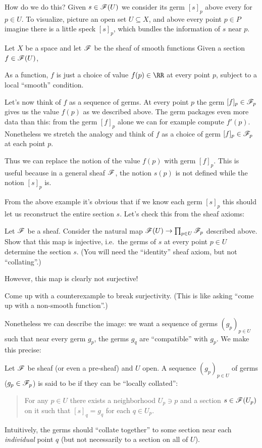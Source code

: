 \documentclass[11pt]{scrreprt}
\begin{document}
How do we do this?
Given $s \in \mathscr F(U)$ we consider its germ $[s]_p$ above every for $p \in U$.
To visualize, picture an open set $U \subseteq X$,
and above every point $p \in P$ imagine there is a little speck $[s]_p$,
which bundles the information of $s$ near $p$.
\begin{example}
	Let $X$ be a space and let $\mathscr F$ be the sheaf of smooth functions 
	Given a section $f \in \mathscr F(U)$,
	\begin{itemize}
		\ii As a function, $f$ is just a choice of value $f(p) \in \RR$ at
		every point $p$, subject to a local ``smooth'' condition.

		\ii Let's now think of $f$ as a sequence of germs.
		At every point $p$ the germ $[f]_p \in \mathscr F_p$ gives us the value $f(p)$
		as we described above. The germ packages even more data than this:
		from the germ $[f]_p$ alone we can for example compute $f'(p)$.
		Nonetheless we stretch the analogy and think of $f$
		as a choice of germ $[f]_p \in \mathscr F_p$ at each point $p$.
	\end{itemize}
	Thus we can replace the notion of the value $f(p)$ with germ $[f]_p$.
	This is useful because in a general sheaf $\mathscr F$, the notion $s(p)$
	is not defined while the notion $[s]_p$ is.
\end{example}

From the above example it's obvious that if we know each germ $[s]_p$
this should let us reconstruct the entire section $s$.
Let's check this from the sheaf axioms:
\begin{exercise}
	Let $\mathscr F$ be a sheaf.
	Consider the natural map $\mathscr F(U) \to \prod_{p \in U} \mathscr F_p$ described above.
	Show that this map is injective, i.e.\
	the germs of $s$ at every point $p \in U$ determine the section $s$.
	(You will need the ``identity'' sheaf axiom, but not ``collating''.)
\end{exercise}

However, this map is clearly not surjective!
\begin{ques}
	Come up with a counterexample to break surjectivity.
	(This is like asking ``come up with a non-smooth function''.)
\end{ques}
Nonetheless we can describe the image:
we want a sequence of germs $(g_p)_{p \in U}$ such that near every germ $g_p$,
the germs $g_q$ are ``compatible'' with $g_p$.
We make this precise:
\begin{definition}
	Let $\mathscr F$ be sheaf (or even a pre-sheaf) and $U$ open.
	A sequence $(g_p)_{p \in U}$ of germs
	($g_p \in \mathscr F_p$) is said to be  if
	they can be ``locally collated'':
	\begin{quote}
		For any $p \in U$ there exists a neighborhood $U_p \ni p$
		and a section $s \in \mathscr F(U_p)$ on it
		such that $[s]_q = g_q$ for each $q \in U_p$.
	\end{quote}
	Intuitively, the germs should ``collate together'' to some section near
	each \emph{individual} point $q$
	(but not necessarily to a section on all of $U$).
\end{definition}
\end{document}
